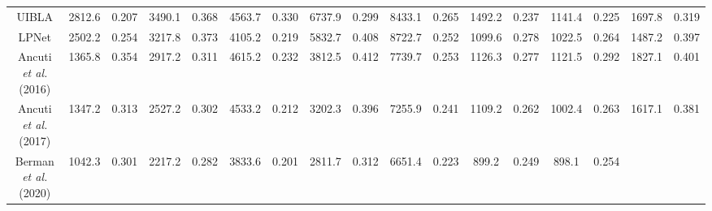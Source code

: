 \documentclass[journal]{IEEEtran}
\begin{document}
\begin{table}[htbp]
{\begin{tabular}{|c|cc|cc|cc|cc|cc|cc|cc|cc|}
UIBLA \cite{blurriness-based}                       & 2812.6                       & 0.207                        & 3490.1                       & 0.368                        & 4563.7                        & 0.330                        & 6737.9                        & 0.299                        & 8433.1                        & 0.265                        & 1492.2                       & 0.237                        & 1141.4                       & 0.225                        & 1697.8                       & 0.319                        \\
LPNet \cite{fu2019lightweight}                       & 2502.2                       & 0.254                        & 3217.8                       & 0.373                        & 4105.2                        & 0.219                        & 5832.7                        & 0.408                        & 8722.7                        & 0.252                        & 1099.6                       & 0.278                        & 1022.5                       & 0.264                        & 1487.2                       & 0.397                        \\
Ancuti \textit{et al.}(2016) \cite{ancuti2016multi}  & 1365.8                       & 0.354                        & 2917.2                       & 0.311                        & 4615.2                        & 0.232                       & 3812.5                        & 0.412                        & 7739.7                        & 0.253                        & 1126.3                       & 0.277                        & 1121.5                       & 0.292                        & 1827.1                       & 0.401                        \\
Ancuti \textit{et al.}(2017) \cite{ancuti2017color}   & 1347.2                       & 0.313                        & 2527.2                       & 0.302                        & 4533.2                        & 0.212                       & 3202.3                       & 0.396                        & 7255.9                        & 0.241                        & 1109.2                       & 0.262                        & 1002.4                       & 0.263                        & 1617.1                       & 0.381                        \\
Berman \textit{et al.}(2020) \cite{berman2020underwater} & 1042.3                       & 0.301                        & 2217.2                       & 0.282                        & 3833.6                        & 0.201                       & 2811.7                       & 0.312                        & 6651.4                        & 0.223                        & 899.2                       & 0.249                        & 898.1                        & 0.254                 

\end{tabular}}
\end{table}
\end{document}
